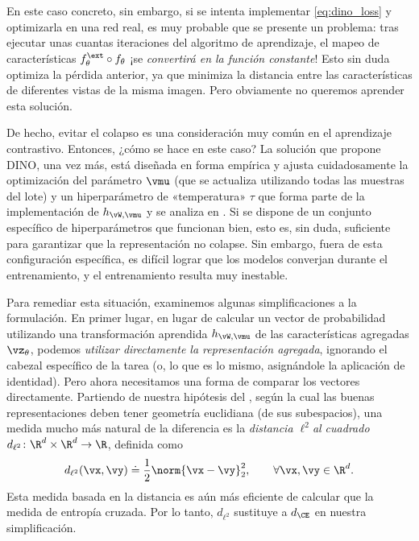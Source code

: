 \documentclass[../../book-main_es.tex]{subfiles}
\begin{document}
En este caso concreto, sin embargo, si se intenta implementar
\eqref{eq:dino_loss} y optimizarla en una red real, es muy
probable que se presente un problema: tras ejecutar unas cuantas
iteraciones del algoritmo de aprendizaje, el mapeo de características
\(f_{\theta}^{\ext} \circ f_{\theta}\) ¡se \textit{convertirá en la
función constante}! Esto sin duda optimiza la pérdida anterior, ya que
minimiza la distancia entre las características de diferentes vistas de la
misma imagen. Pero obviamente no queremos aprender esta solución.

De hecho, evitar el colapso es una consideración muy común en
el aprendizaje contrastivo. Entonces, ¿cómo se hace en este caso? La solución
que propone DINO, una vez más, está diseñada en forma empírica y ajusta cuidadosamente la
optimización del parámetro \(\vmu\) (que se actualiza utilizando todas
las muestras del lote) y un hiperparámetro de «temperatura» \(\tau\)
que forma parte de la implementación de \(h_{\vW, \vmu}\) y
se analiza en . Si se dispone de
un conjunto específico de hiperparámetros que funcionan bien, esto es, sin duda,
suficiente para garantizar que la representación no colapse. Sin embargo, fuera
de esta configuración específica, es difícil lograr que los modelos
converjan durante el entrenamiento, y el entrenamiento resulta muy inestable.

Para remediar esta situación, examinemos algunas simplificaciones a la
formulación. En primer lugar, en lugar de calcular un vector de probabilidad utilizando una
transformación aprendida \(h_{\vW, \vmu}\) de las características agregadas
\(\vz_{\theta}\), podemos \textit{utilizar directamente la representación agregada},
ignorando el cabezal específico de la tarea (o, lo que es lo mismo,
asignándole la aplicación de identidad). Pero ahora necesitamos una forma de comparar
los vectores directamente. Partiendo de nuestra hipótesis del
, según la cual las buenas representaciones deben tener
geometría euclidiana (de sus subespacios), una medida mucho más natural de la
diferencia es la \textit{distancia \(\ell^{2}\)al cuadrado}
\(d_{\ell^{2}} \colon \R^{d} \times \R^{d} \to \R\), definida como
\begin{equation}\label{eq:cosine_similarity}
    d_{\ell^{2}}(\vx, \vy) \doteq \frac{1}{2}\norm{\vx -
    \vy}_{2}^{2}, \qquad  \forall \vx, \vy \in \R^{d}.
\end{equation}
Esta medida basada en la distancia es aún más eficiente de calcular que la
medida de entropía cruzada. Por lo tanto, \(d_{\ell^{2}}\) sustituye a
\(d_{\CE}\) en nuestra simplificación.
\end{document}
